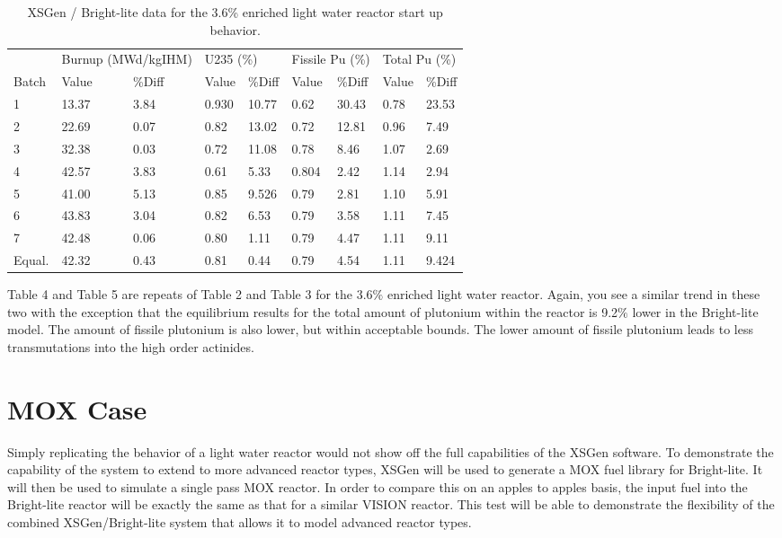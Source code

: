 \documentclass{article}
\begin{document}
\begin{table}[]
\centering
\caption{XSGen / Bright-lite data for the 3.6\% enriched light water reactor start up behavior.}
\label{Table 5}
\begin{tabular}{lllllllll}
 & \multicolumn{2}{l}{Burnup (MWd/kgIHM)} & \multicolumn{2}{l}{U235 (\%)} & \multicolumn{2}{l}{Fissile Pu (\%)} & \multicolumn{2}{l}{Total Pu (\%)} \\
Batch & Value & \%Diff & Value & \%Diff & Value & \%Diff & Value & \%Diff \\
1 & 13.37 & 3.84 & 0.930 & 10.77 & 0.62 & 30.43 & 0.78 & 23.53 \\
2 & 22.69 & 0.07 & 0.82 & 13.02 & 0.72 & 12.81 & 0.96 & 7.49 \\
3 & 32.38 & 0.03 & 0.72 & 11.08 & 0.78 & 8.46 & 1.07 & 2.69 \\
4 & 42.57 & 3.83 & 0.61 & 5.33 & 0.804 & 2.42 & 1.14 & 2.94 \\
5 & 41.00 & 5.13 & 0.85 & 9.526 & 0.79 & 2.81 & 1.10 & 5.91 \\
6 & 43.83 & 3.04 & 0.82 & 6.53 & 0.79 & 3.58 & 1.11 & 7.45 \\
7 & 42.48 & 0.06 & 0.80 & 1.11 & 0.79 & 4.47 & 1.11 & 9.11 \\
Equal. & 42.32 & 0.43 & 0.81 & 0.44 & 0.79 & 4.54 & 1.11 & 9.424
\end{tabular}
\end{table}

Table 4 and Table 5 are repeats of Table 2 and Table 3 for the 3.6$\%$ enriched light water reactor. Again, you see a similar trend in these two with the exception that the equilibrium results for the total amount of plutonium within the reactor is 9.2$\%$ lower in the Bright-lite model. The amount of fissile plutonium is also lower, but within acceptable bounds. The lower amount of fissile plutonium leads to less transmutations into the high order actinides. 

\section{MOX Case}
Simply replicating the behavior of a light water reactor would not show off the full capabilities of the XSGen software. To demonstrate the capability of the system to extend to more advanced reactor types, XSGen will be used to generate a MOX fuel library for Bright-lite. It will then be used to simulate a single pass MOX reactor. In order to compare this on an apples to apples basis, the input fuel into the Bright-lite reactor will be exactly the same as that for a similar VISION reactor. This test will be able to demonstrate the flexibility of the combined XSGen/Bright-lite system that allows it to model advanced reactor types. 
\end{document}
